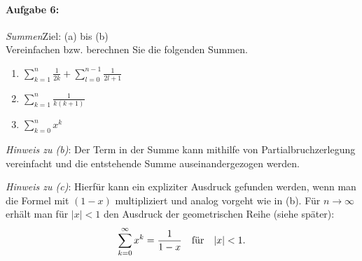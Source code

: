 
\paragraph{Aufgabe 6: } \emph{Summen}\hfill Ziel: (a) bis (b)\\[0.2cm]
Vereinfachen bzw. berechnen Sie die folgenden Summen. 

\begin{enumerate}[label=(\alph*), labelindent=1em,labelsep=0.5cm]
    \item $\sum_{k=1}^n \frac{1}{2k} + \sum_{l=0}^{n-1} \frac{1}{2l+1}$
    \item $\sum_{k=1}^n \frac{1}{k(k+1)}$
    \item $\sum_{k=0}^n x^k$ 
\end{enumerate}

\emph{Hinweis zu (b)}: Der Term in der Summe kann mithilfe von Partialbruchzerlegung vereinfacht und die entstehende Summe auseinandergezogen werden. 

\emph{Hinweis zu (c)}: Hierfür kann ein expliziter Ausdruck gefunden werden, wenn man die Formel mit $(1-x)$ multipliziert und analog vorgeht wie in (b). Für $n\to \infty$ erhält man für $|x|<1$ den Ausdruck der geometrischen Reihe (siehe später): 
\begin{align*}
        \sum_{k=0}^\infty x^k = \frac{1}{1-x} \qq{für} |x| <1.
\end{align*}